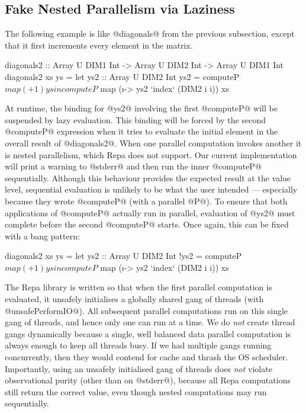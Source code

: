 \subsection{Fake Nested Parallelism via Laziness}
The following example is like @diagonals@ from the previous subsection, except that it first increments every element in the matrix.
\par
\begin{small}
\begin{code}
 diagonals2 :: Array U DIM1 Int -> Array U DIM2 Int
            -> Array U DIM1 Int
 diagonals2 xs ys
  = let ys2 :: Array U DIM2 Int
        ys2 = computeP $ map (+ 1) ys
    in  computeP $ map (\i -> ys2 `index` (DIM2 i i)) xs
\end{code}
\end{small}
%
At runtime, the binding for @ys2@ involving the first @computeP@ will be suspended by lazy evaluation. This binding will be forced by the second @computeP@ expression when it tries to evaluate the initial element in the overall result of @diagonals2@. When one parallel computation invokes another it is nested parallelism, which Repa does not support. Our current implementation will print a warning to @stderr@ and then run the inner @computeP@ sequentially. 
%
Although this behaviour provides the expected result at the value level, sequential evaluation is unlikely to be what the user intended --- especially because they wrote @computeP@ (with a parallel @P@). To ensure that both applications of @computeP@ actually run in parallel, evaluation of @ys2@ must complete before the second @computeP@ starts. Once again, this can be fixed with a bang pattern:
%
\begin{small}
\begin{code}       
 diagonals2 xs ys
  = let ys2 :: Array U DIM2 Int
        !ys2 = computeP $ map (+ 1) ys
    in  computeP $ map (\i -> ys2 `index` (DIM2 i i)) xs
\end{code}
\end{small}
%
The Repa library is written so that when the first parallel computation is evaluated, it unsafely initialises a globally shared gang of threads (with @unsafePerformIO@). All subsequent parallel computations run on this single gang of threads, and hence only one can run at a time. We do \emph{not} create thread gangs dynamically because a single, well balanced data parallel computation is always enough to keep all threads busy. If we had multiple gangs running concurrently, then they would contend for cache and thrash the OS scheduler. Importantly, using an unsafely initialised gang of threads does \emph{not} violate observational purity (other than on @stderr@), because all Repa computations still return the correct value, even though nested computations may run sequentially.

